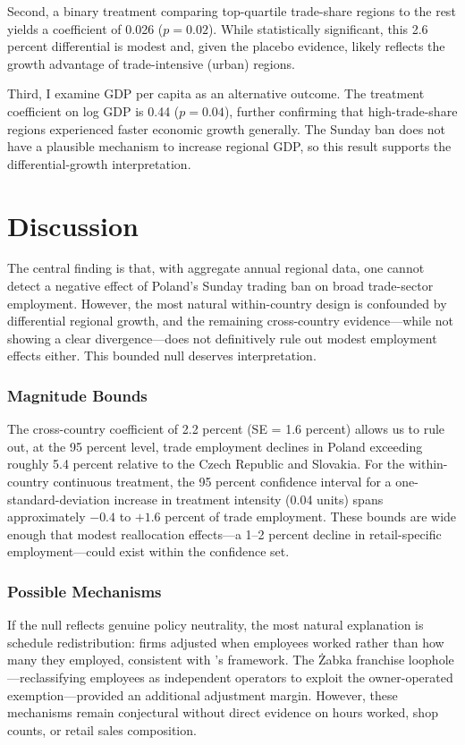\documentclass[12pt]{article}
\begin{document}
Second, a binary treatment comparing top-quartile trade-share regions to the rest yields a coefficient of 0.026 ($p = 0.02$). While statistically significant, this 2.6 percent differential is modest and, given the placebo evidence, likely reflects the growth advantage of trade-intensive (urban) regions.

Third, I examine GDP per capita as an alternative outcome. The treatment coefficient on log GDP is 0.44 ($p = 0.04$), further confirming that high-trade-share regions experienced faster economic growth generally. The Sunday ban does not have a plausible mechanism to increase regional GDP, so this result supports the differential-growth interpretation.


\section{Discussion}
\label{sec:discussion}

The central finding is that, with aggregate annual regional data, one cannot detect a negative effect of Poland's Sunday trading ban on broad trade-sector employment. However, the most natural within-country design is confounded by differential regional growth, and the remaining cross-country evidence---while not showing a clear divergence---does not definitively rule out modest employment effects either. This bounded null deserves interpretation.

\subsubsection*{Magnitude Bounds} The cross-country coefficient of 2.2 percent (SE = 1.6 percent) allows us to rule out, at the 95 percent level, trade employment declines in Poland exceeding roughly 5.4 percent relative to the Czech Republic and Slovakia. For the within-country continuous treatment, the 95 percent confidence interval for a one-standard-deviation increase in treatment intensity (0.04 units) spans approximately $-0.4$ to $+1.6$ percent of trade employment. These bounds are wide enough that modest reallocation effects---a 1--2 percent decline in retail-specific employment---could exist within the confidence set.

\subsubsection*{Possible Mechanisms} If the null reflects genuine policy neutrality, the most natural explanation is schedule redistribution: firms adjusted when employees worked rather than how many they employed, consistent with \citet{Hamermesh1999}'s framework. The \.{Z}abka franchise loophole---reclassifying employees as independent operators to exploit the owner-operated exemption---provided an additional adjustment margin. However, these mechanisms remain conjectural without direct evidence on hours worked, shop counts, or retail sales composition.
\end{document}
